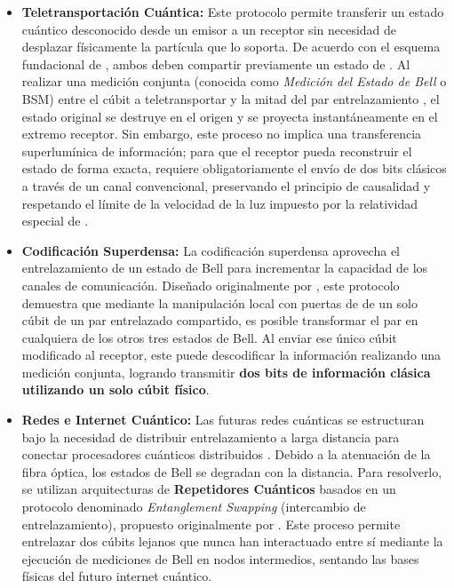 \documentclass[11pt,a4paper,spanish]{book}
\begin{document}
\begin{itemize}
    \item \textbf{Teletransportación Cuántica:} Este protocolo permite transferir un estado cuántico desconocido desde un emisor a un receptor sin necesidad de desplazar físicamente la partícula que lo soporta. De acuerdo con el esquema fundacional de \cite{bennett1993}, ambos deben compartir previamente un estado de \cite{bell1964}. Al realizar una medición conjunta (conocida como \emph{Medición del Estado de Bell} o BSM) entre el cúbit a teletransportar y la mitad del par entrelazamiento \citep{schrodinger1935}, el estado original se destruye en el origen y se proyecta instantáneamente en el extremo receptor. Sin embargo, este proceso no implica una transferencia superlumínica de información; para que el receptor pueda reconstruir el estado de forma exacta, requiere obligatoriamente el envío de dos bits clásicos a través de un canal convencional, preservando el principio de causalidad y respetando el límite de la velocidad de la luz impuesto por la relatividad especial de \cite{einstein1905}.
    
    \item \textbf{Codificación Superdensa:} La codificación superdensa aprovecha el entrelazamiento de un estado de Bell para incrementar la capacidad de los canales de comunicación. Diseñado originalmente por \cite{bennett1992dense}, este protocolo demuestra que mediante la manipulación local con puertas de \cite{pauli1927} de un solo cúbit de un par entrelazado compartido, es posible transformar el par en cualquiera de los otros tres estados de Bell. Al enviar ese único cúbit modificado al receptor, este puede descodificar la información realizando una medición conjunta, logrando transmitir \textbf{dos bits de información clásica utilizando un solo cúbit físico}.
    
    \item \textbf{Redes e Internet Cuántico:} Las futuras redes cuánticas se estructuran bajo la necesidad de distribuir entrelazamiento a larga distancia para conectar procesadores cuánticos distribuidos \citep{kimble2008}. Debido a la atenuación de la fibra óptica, los estados de Bell se degradan con la distancia. Para resolverlo, se utilizan arquitecturas de \textbf{Repetidores Cuánticos} basados en un protocolo denominado \emph{Entanglement Swapping} (intercambio de entrelazamiento), propuesto originalmente por \cite{zukowski1993}. Este proceso permite entrelazar dos cúbits lejanos que nunca han interactuado entre sí mediante la ejecución de mediciones de Bell en nodos intermedios, sentando las bases físicas del futuro internet cuántico.
\end{itemize}
\end{document}
